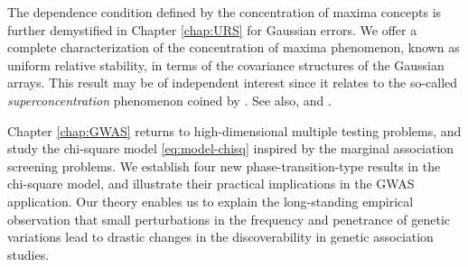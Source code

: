 The dependence condition defined by the concentration of maxima  concepts is further demystified in Chapter \ref{chap:URS} for Gaussian errors.
We offer a complete characterization of the concentration of maxima phenomenon, known as uniform relative stability, in terms of the covariance structures of the Gaussian arrays.
This result may be of independent interest since it relates to the so-called \emph{superconcentration} phenomenon coined by \cite{chatterjee2014superconcentration}.
See also, \cite{gao2018fundamental} and \citet*{kartsioukas2019rate}.

Chapter \ref{chap:GWAS} returns to high-dimensional multiple testing problems, and study the chi-square model \eqref{eq:model-chisq} inspired by the marginal association screening problems.
We establish four new phase-transition-type results in the chi-square model, and illustrate their practical implications in the GWAS application.
Our theory enables us to explain the long-standing empirical observation that small perturbations in the frequency and penetrance of genetic variations lead to drastic changes in the discoverability in genetic association studies.



